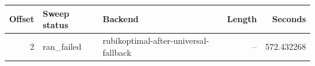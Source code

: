 {\small
\begin{tabular}{rllrr}
\hline
Offset & Sweep status & Backend & Length & Seconds \\
\hline
2 & ran_failed & rubikoptimal-after-universal-fallback & -- & 572.432268 \\
\hline
\end{tabular}
}
